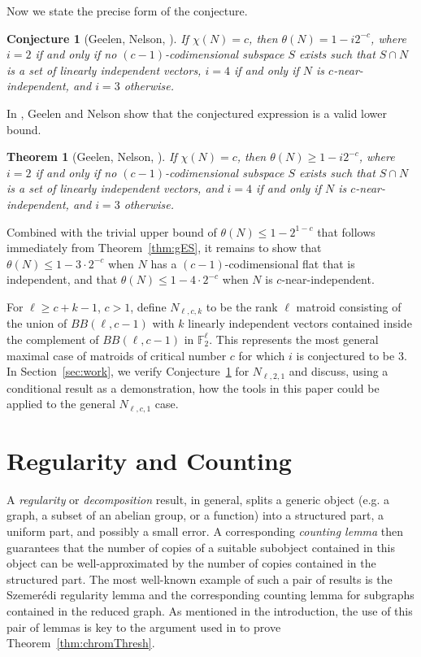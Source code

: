 \documentclass{article}
\theoremstyle{plain}
\newtheorem{thm}[theorem]{Theorem}
\newtheorem{conj}[theorem]{Conjecture}
\theoremstyle{definition}
\theoremstyle{definition}
\theoremstyle{remark}
\numberwithin{equation}{section}
\newcommand{\FF}{\mathbb{F}}
\begin{document}
Now we state the precise form of the conjecture.

\begin{conj}[Geelen, Nelson, {\cite[Conj~5.2]{main}}]
\label{conj:main}
If $\chi(N)=c$, then $\theta(N)=1-i2^{-c}$, where $i=2$ if and only if no $(c-1)$-codimensional subspace $S$ exists such that $S\cap N$ is a set of linearly independent vectors, $i=4$ if and only if $N$ is $c$-near-independent, and $i=3$ otherwise.
\end{conj}

In \cite{main}, Geelen and Nelson show that the conjectured expression is a valid lower bound.

\begin{thm}[Geelen, Nelson, {\cite[Thm~5.4]{main}}]
\label{thm:lower}
If $\chi(N)=c$, then $\theta(N)\geq 1-i2^{-c}$, where $i=2$ if and only if no $(c-1)$-codimensional subspace $S$ exists such that $S\cap N$ is a set of linearly independent vectors, and $i=4$ if and only if $N$ is $c$-near-independent, and $i=3$ otherwise.
\end{thm}


Combined with the trivial upper bound of $\theta(N)\leq 1 - 2^{1-c}$ that follows immediately from Theorem~\ref{thm:gES}, it remains to show that $\theta(N)\leq 1 - 3\cdot 2^{-c}$ when $N$ has a $(c-1)$-codimensional flat that is independent, and that $\theta(N)\leq 1 - 4\cdot 2^{-c}$ when $N$ is $c$-near-independent.

For $\ell\geq c+k-1$, $c>1$, define $N_{\ell,c,k}$ to be the rank $\ell$ matroid consisting of the union of $BB(\ell,c-1)$ with $k$ linearly independent vectors contained inside the complement of $BB(\ell,c-1)$ in $\FF_2^\ell$. This represents the most general maximal case of matroids of critical number $c$ for which $i$ is conjectured to be $3$. In Section~\ref{sec:work}, we verify Conjecture~\ref{conj:main} for $N_{\ell,2,1}$ and discuss, using a conditional result as a demonstration, how the tools in this paper could be applied to the general $N_{\ell,c,1}$ case.

\section{Regularity and Counting}

A \emph{regularity} or \emph{decomposition} result, in general, splits a generic object (e.g. a graph, a subset of an abelian group, or a function) into a structured part, a uniform part, and possibly a small error. A corresponding \emph{counting lemma} then guarantees that the number of copies of a suitable subobject contained in this object can be well-approximated by the number of copies contained in the structured part. The most well-known example of such a pair of results is the Szemerédi regularity lemma and the corresponding counting lemma for subgraphs contained in the reduced graph. As mentioned in the introduction, the use of this pair of lemmas is key to the argument used in \cite{chromThresh} to prove Theorem~\ref{thm:chromThresh}.
\end{document}
